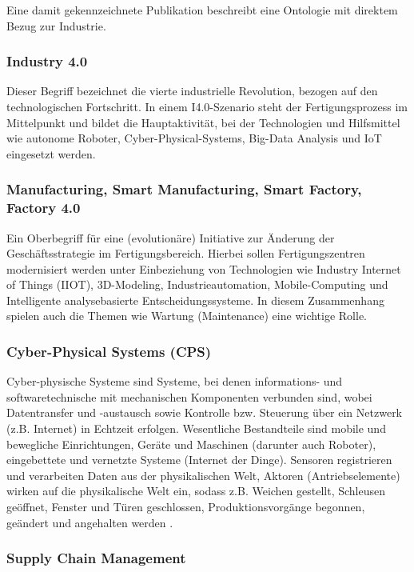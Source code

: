 \documentclass{article}
\begin{document}
Eine damit gekennzeichnete Publikation beschreibt eine Ontologie mit direktem Bezug zur Industrie.

\subsubsection{Industry 4.0}

Dieser Begriff bezeichnet die vierte industrielle Revolution, bezogen auf den technologischen Fortschritt. In einem I4.0-Szenario steht der Fertigungsprozess im Mittelpunkt und bildet die Hauptaktivität, bei der Technologien und Hilfsmittel wie autonome Roboter, Cyber-Physical-Systems, Big-Data Analysis und IoT eingesetzt werden.

\subsubsection{Manufacturing, Smart Manufacturing, Smart Factory, Factory 4.0}

Ein Oberbegriff für eine (evolutionäre) Initiative zur Änderung der Geschäftsstrategie im Fertigungsbereich.
Hierbei sollen Fertigungszentren modernisiert werden unter Einbeziehung von Technologien wie Industry Internet of Things (IIOT), 3D-Modeling, Industrieautomation, Mobile-Computing und Intelligente analysebasierte Entscheidungssysteme.
In diesem Zusammenhang spielen auch die Themen wie Wartung (Maintenance) eine wichtige Rolle.

\subsubsection{Cyber-Physical Systems (CPS)}

Cyber-physische Systeme sind Systeme, bei denen informations- und softwaretechnische mit mechanischen Komponenten verbunden sind, wobei Datentransfer und -austausch sowie Kontrolle bzw. Steuerung über ein Netzwerk (z.B. Internet) in Echtzeit erfolgen.
Wesentliche Bestandteile sind mobile und bewegliche Einrichtungen, Geräte und Maschinen (darunter auch Roboter), eingebettete und vernetzte Systeme (Internet der Dinge).
Sensoren registrieren und verarbeiten Daten aus der physikalischen Welt, Aktoren (Antriebselemente) wirken auf die physikalische Welt ein, sodass z.B. Weichen gestellt, Schleusen geöffnet, Fenster und Türen geschlossen, Produktionsvorgänge begonnen, geändert und angehalten werden \cite{GablerCPS2024}.

\subsubsection{Supply Chain Management}
\end{document}
